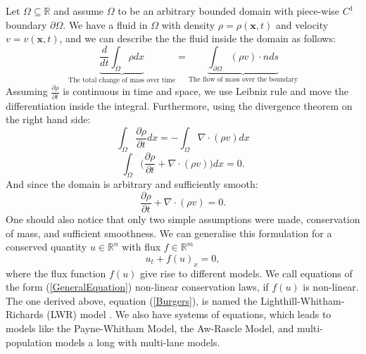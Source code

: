 \documentclass[10pt]{article}
\numberwithin{equation}{section}
\begin{document}
Let $\Omega \subseteq \mathbb{R}$ and assume $\Omega$ to be an arbitrary bounded domain with piece-wise $C^1$ boundary $\partial \Omega$. We have a fluid in $\Omega$ with density $\rho = \rho(\boldsymbol{x}, t)$ and velocity $v = v(\boldsymbol x, t)$, and we can describe the the fluid inside the domain as follows:
\begin{equation*}
    \underbrace{\frac{d}{dt} \int_{\Omega} \rho dx }_{ \text{The total change of mass over time}}  = \underbrace{\int_{\partial \Omega} (\rho v) \cdot n ds }_{\text{The flow of mass over the boundary}}
\end{equation*}
Assuming $\frac{\partial \rho}{\partial t}$ is continuous in time and space, we use Leibniz rule and move the differentiation inside the integral. Furthermore, using the divergence theorem on the right hand side: 
\begin{equation*}
    \int_{\Omega} \frac{\partial \rho}{\partial t} dx   = - \int_{\Omega} \nabla \cdot (\rho v)dx 
\end{equation*}
\begin{equation*}
    \int_{\Omega} \big ( \frac{\partial \rho}{\partial t}  + \nabla \cdot (\rho v) \big ) dx   = 0.
\end{equation*}
And since the domain is arbitrary and sufficiently smooth: 
\begin{equation}
    \frac{\partial \rho}{\partial t}  + \nabla \cdot (\rho v) = 0.
\label{Burgers}
\end{equation}
One should also notice that only two simple assumptions were made, conservation of mass, and sufficient smoothness. We can generalise this formulation for a conserved quantity $u \in \mathbb{R}^n$ with flux $ f \in \mathbb{R}^m$ 
\begin{equation}
    u_t + f(u)_x = 0, 
    \label{GeneralEquation}
\end{equation}
where the flux function $f(u)$ give rise to different models. We call equations of the form (\ref{GeneralEquation}) non-linear conservation laws, if $f(u)$ is non-linear. The one derived above, equation (\ref{Burgers}), is named the Lighthill-Whitham-Richards (LWR) model \cite{LWROrig}. We also have systems of equations, which leads to models like the Payne-Whitham Model, the Aw-Rascle Model, and multi-population models a long with multi-lane models. 
\end{document}
